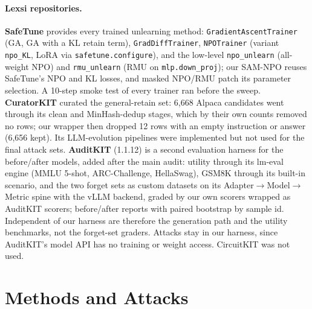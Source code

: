 \documentclass[10pt,twocolumn,letterpaper]{article}
\begin{document}
\paragraph{Lexsi repositories.} \textbf{SafeTune} provides every trained unlearning method: \texttt{GradientAscentTrainer}
(GA, GA with a KL retain term), \texttt{GradDiffTrainer}, \texttt{NPOTrainer} (variant \texttt{npo\_KL}, LoRA via
\texttt{safetune.configure}), and the low-level \texttt{npo\_unlearn} (all-weight NPO) and \texttt{rmu\_unlearn} (RMU on
\texttt{mlp.down\_proj}); our SAM-NPO reuses SafeTune's NPO and KL losses, and masked NPO/RMU patch its parameter selection.
A 10-step smoke test of every trainer ran before the sweep. \textbf{CuratorKIT} curated the general-retain set:
6{,}668 Alpaca candidates went through its clean and MinHash-dedup stages, which by their
own counts removed no rows; our wrapper then dropped 12 rows with an empty instruction or answer (6{,}656 kept). Its
LLM-evolution pipelines were implemented but not used for the final attack sets. \textbf{AuditKIT} (1.1.12) is a second
evaluation harness for the before/after models, added after the main audit: utility through its lm-eval engine (MMLU
5-shot, ARC-Challenge, HellaSwag), GSM8K through its built-in scenario, and the two forget sets as custom datasets on its
Adapter$\rightarrow$Model$\rightarrow$Metric spine with the vLLM backend, graded by our own scorers wrapped as AuditKIT
scorers; before/after reports with paired bootstrap by sample id. Independent of our harness are therefore the generation
path and the utility benchmarks, not the forget-set graders. Attacks stay in our harness, since AuditKIT's model API has no
training or weight access. CircuitKIT was not used.

\section{Methods and Attacks}
\end{document}
